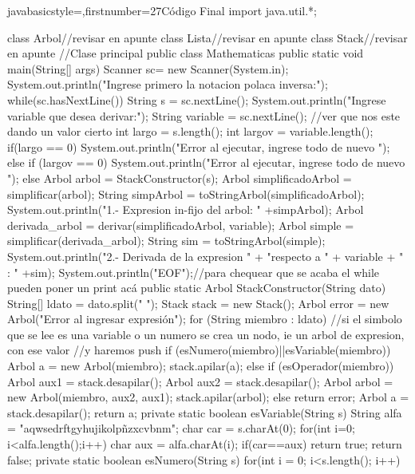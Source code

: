 \documentclass[letterpaper,11pt]{article} %
\begin{document}
\begin{sourcecodep}[\label{Codigo Final}]{java}{basicstyle={\fontsize{7}{10}\selectfont\ttfamily},firstnumber=27}{Código Final}
	import java.util.*;

	class Arbol{//revisar en apunte
	}
	class Lista{//revisar en apunte
	}
	class Stack{//revisar en apunte
	}
	//Clase principal
public class Mathematicas{
	public static void main(String[] args){
		Scanner sc= new Scanner(System.in);
		System.out.println("Ingrese primero la notacion polaca inversa:");
		while(sc.hasNextLine()){
			String s = sc.nextLine();
			System.out.println("Ingrese variable que desea derivar:");
			String variable = sc.nextLine(); 
			//ver que nos este dando un valor cierto
			int largo = s.length();
			int largov = variable.length();
			if(largo == 0){
				System.out.println("Error al ejecutar, ingrese todo de nuevo ");
			}
			else if (largov == 0){
				System.out.println("Error al ejecutar, ingrese todo de nuevo ");
			}
			else{
				Arbol arbol = StackConstructor(s);
				Arbol simplificadoArbol = simplificar(arbol);
				String simpArbol = toStringArbol(simplificadoArbol);
				System.out.println("1.-  Expresion in-fijo del arbol: " +simpArbol);
				Arbol derivada_arbol = derivar(simplificadoArbol, variable);
				Arbol simple = simplificar(derivada_arbol);
				String sim = toStringArbol(simple);
				System.out.println("2.-  Derivada de la expresion " + "respecto a " + variable + " : " +sim);
			}
		}
		System.out.println("EOF");//para chequear que se acaba el while pueden poner un print acá 
	}
	public static Arbol StackConstructor(String dato){
		String[] ldato = dato.split(" ");
		Stack stack = new Stack();
		Arbol error = new Arbol("Error al ingresar expresión");
		for (String miembro : ldato){
			//si el simbolo que se lee es una variable o un numero se crea un nodo, ie un arbol de expresion, con ese valor
			//y haremos push
			if (esNumero(miembro)||esVariable(miembro)){
				Arbol a = new Arbol(miembro);
				stack.apilar(a);
			}
			else if (esOperador(miembro)){
				Arbol aux1 = stack.desapilar();
				Arbol aux2 = stack.desapilar();
				Arbol arbol = new Arbol(miembro, aux2, aux1);
				stack.apilar(arbol);
			}
			else return error;
		}
		Arbol a = stack.desapilar();
		return a;
	}
	private static boolean esVariable(String s){
		String alfa = "aqwsedrftgyhujikolpñzxcvbnm";
		char car = s.charAt(0);
		for(int i=0; i<alfa.length();i++){
			char aux = alfa.charAt(i);
			if(car==aux){
				return true;
			}
		}
		return false;
	}
	private static boolean esNumero(String s){
		for(int i = 0; i<s.length(); i++){
}}}
\end{sourcecodep}
\end{document}
